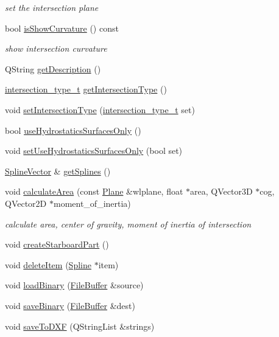\begin{DoxyCompactItemize}
\begin{DoxyCompactList}\small\item\em set the intersection plane \end{DoxyCompactList}\item 
bool \hyperlink{classShipCAD_1_1Intersection_a03df44a32b35481bf362af342f8b1aef}{is\-Show\-Curvature} () const 
\begin{DoxyCompactList}\small\item\em show intersection curvature \end{DoxyCompactList}\item 
Q\-String \hyperlink{classShipCAD_1_1Intersection_ab0434113cfd34c8a3ab11f75976dbf5b}{get\-Description} ()
\item 
\hyperlink{namespaceShipCAD_aa56834b730aafdf2786ddc9a60a046fd}{intersection\-\_\-type\-\_\-t} \hyperlink{classShipCAD_1_1Intersection_a1b93db56e5877226b30871754bba9838}{get\-Intersection\-Type} ()
\item 
void \hyperlink{classShipCAD_1_1Intersection_af7b14b73d2fa77157fe7a46fce5490dd}{set\-Intersection\-Type} (\hyperlink{namespaceShipCAD_aa56834b730aafdf2786ddc9a60a046fd}{intersection\-\_\-type\-\_\-t} set)
\item 
bool \hyperlink{classShipCAD_1_1Intersection_a5ac5f3018d8b95b57ab40ccafe782bf4}{use\-Hydrostatics\-Surfaces\-Only} ()
\item 
void \hyperlink{classShipCAD_1_1Intersection_a7dccd8a9562004bb88edd94588395600}{set\-Use\-Hydrostatics\-Surfaces\-Only} (bool set)
\item 
\hyperlink{namespaceShipCAD_a053b941b2c87049bb9380428d4d5a056}{Spline\-Vector} \& \hyperlink{classShipCAD_1_1Intersection_a0092acbb149bb6a5c2e1f9a4b300c2da}{get\-Splines} ()
\item 
void \hyperlink{classShipCAD_1_1Intersection_a9e5c13aed9e318f7a5edf02214cfc6f9}{calculate\-Area} (const \hyperlink{classShipCAD_1_1Plane}{Plane} \&wlplane, float $\ast$area, Q\-Vector3\-D $\ast$cog, Q\-Vector2\-D $\ast$moment\-\_\-of\-\_\-inertia)
\begin{DoxyCompactList}\small\item\em calculate area, center of gravity, moment of inertia of intersection \end{DoxyCompactList}\item 
void \hyperlink{classShipCAD_1_1Intersection_a0af2af543403b3c69d1d3c786a1c6575}{create\-Starboard\-Part} ()
\item 
void \hyperlink{classShipCAD_1_1Intersection_ada420a69dc8141794aa617f966cbe2b2}{delete\-Item} (\hyperlink{classShipCAD_1_1Spline}{Spline} $\ast$item)
\item 
void \hyperlink{classShipCAD_1_1Intersection_a3e87aa28a1e1d721fe657a73d5466f3b}{load\-Binary} (\hyperlink{classShipCAD_1_1FileBuffer}{File\-Buffer} \&source)
\item 
void \hyperlink{classShipCAD_1_1Intersection_a41ce3a17845a7808d052713ae57dbe63}{save\-Binary} (\hyperlink{classShipCAD_1_1FileBuffer}{File\-Buffer} \&dest)
\item 
void \hyperlink{classShipCAD_1_1Intersection_a00a6d7ad7e82e43bd0287fa88dd87cf3}{save\-To\-D\-X\-F} (Q\-String\-List \&strings)
\end{DoxyCompactItemize}
